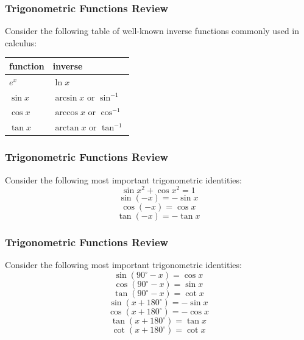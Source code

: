 \documentclass[xcolor=dvipsnames]{beamer}
\begin{document}
\begin{frame}
  \frametitle{Trigonometric Functions Review}
  Consider the following table of well-known inverse functions
  commonly used in calculus:

  \begin{tabular}{|l|l|}\hline
    \textbf{function} & \textbf{inverse} \\ \hline
    $e^{x}$ & $\ln{}x$ \\ \hline
    $\sin{}x$ & $\arcsin{}x\mbox{ or }\sin^{-1}$ \\ \hline
    $\cos{}x$ & $\arccos{}x\mbox{ or }\cos^{-1}$ \\ \hline
    $\tan{}x$ & $\arctan{}x\mbox{ or }\tan^{-1}$ \\ \hline
  \end{tabular}
\end{frame}

\begin{frame}
  \frametitle{Trigonometric Functions Review}
  Consider the following most important trigonometric identities:
  \begin{equation}
    \label{eq:shutooth}
    \sin{}x^{2}+\cos{}x^{2}=1
  \end{equation}
\begin{equation}
  \label{eq:iegaexah}
  \sin(-x)=-\sin{}x
\end{equation}
\begin{equation}
  \label{eq:gaijohra}
  \cos(-x)=\cos{}x
\end{equation}
\begin{equation}
  \label{eq:doajeigh}
  \tan(-x)=-\tan{}x
\end{equation}
\end{frame}

\begin{frame}
  \frametitle{Trigonometric Functions Review}
  Consider the following most important trigonometric identities:
\begin{equation}
  \label{eq:dieteipa}
  \sin(90^{\circ}-x)=\cos{}x
\end{equation}
\begin{equation}
  \label{eq:oepoodoh}
  \cos(90^{\circ}-x)=\sin{}x
\end{equation}
\begin{equation}
  \label{eq:aiwatong}
  \tan(90^{\circ}-x)=\cot{}x
\end{equation}
\begin{equation}
  \label{eq:jahpeexu}
  \sin(x+180^{\circ})=-\sin{}x
\end{equation}
\begin{equation}
  \label{eq:aephuemo}
  \cos(x+180^{\circ})=-\cos{}x
\end{equation}
\begin{equation}
  \label{eq:xaiyahcu}
  \tan(x+180^{\circ})=\tan{}x
\end{equation}
\begin{equation}
  \label{eq:aitahwae}
  \cot(x+180^{\circ})=\cot{}x
\end{equation}
\end{frame}
\end{document}
